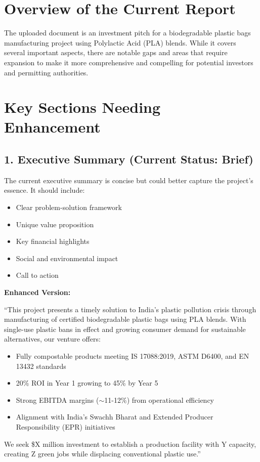 \section*{Overview of the Current Report}
The uploaded document is an investment pitch for a biodegradable plastic bags manufacturing project using Polylactic Acid (PLA) blends. While it covers several important aspects, there are notable gaps and areas that require expansion to make it more comprehensive and compelling for potential investors and permitting authorities.

\section*{Key Sections Needing Enhancement}

\subsection*{1. Executive Summary (Current Status: Brief)}
The current executive summary is concise but could better capture the project's essence. It should include:
\begin{itemize}
\item Clear problem-solution framework
\item Unique value proposition
\item Key financial highlights
\item Social and environmental impact
\item Call to action
\end{itemize}

\textbf{Enhanced Version:}

``This project presents a timely solution to India's plastic pollution crisis through manufacturing of certified biodegradable plastic bags using PLA blends. With single-use plastic bans in effect and growing consumer demand for sustainable alternatives, our venture offers:
\begin{itemize}
\item Fully compostable products meeting IS 17088:2019, ASTM D6400, and EN 13432 standards
\item 20\% ROI in Year 1 growing to 45\% by Year 5
\item Strong EBITDA margins ($\sim$11-12\%) from operational efficiency
\item Alignment with India's Swachh Bharat and Extended Producer Responsibility (EPR) initiatives
\end{itemize}
We seek \$X million investment to establish a production facility with Y capacity, creating Z green jobs while displacing conventional plastic use.''

